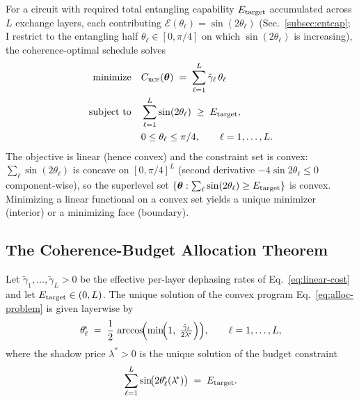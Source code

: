 For a circuit with required total entangling capability
$E_{\rm target}$ accumulated across $L$ exchange layers, each
contributing $\mathcal{E}(\theta_\ell) = \sin(2\theta_\ell)$
(Sec.~\ref{subsec:entcap}; I restrict to the entangling half
$\theta_\ell \in [0, \pi/4]$ on which $\sin(2\theta_\ell)$ is
increasing), the coherence-optimal schedule solves
%
\begin{equation}
\label{eq:alloc-problem}
\begin{aligned}
\text{minimize}\quad & C_{\textsc{rcf}}(\boldsymbol\theta) \;=\;
   \sum_{\ell=1}^L \tilde\gamma_\ell\, \theta_\ell \\
\text{subject to}\quad & \sum_{\ell=1}^L \sin(2\theta_\ell) \;\geq\; E_{\rm target}, \\
& 0 \leq \theta_\ell \leq \pi/4, \qquad \ell = 1,\dots, L.
\end{aligned}
\end{equation}
%
The objective is linear (hence convex) and the constraint set is
convex: $\sum_\ell \sin(2\theta_\ell)$ is concave on
$[0,\pi/4]^L$ (second derivative $-4\sin 2\theta_\ell \leq 0$
component-wise), so the superlevel set
$\{\boldsymbol\theta : \sum_\ell \sin(2\theta_\ell) \geq E_{\rm target}\}$
is convex.
Minimizing a linear functional on a convex set yields a unique
minimizer (interior) or a minimizing face (boundary).

\subsection{The Coherence-Budget Allocation Theorem}
\label{subsec:thm-alloc}

\begin{theorem}
\label{thm:alloc}
Let $\tilde\gamma_1,\dots,\tilde\gamma_L > 0$ be the effective
per-layer dephasing rates of Eq.~\eqref{eq:linear-cost} and let
$E_{\rm target} \in (0, L)$.
The unique solution of the convex program
Eq.~\eqref{eq:alloc-problem} is given layerwise by
%
\begin{equation}
\label{eq:alloc-solution}
\theta_\ell^{\!*} \;=\;
  \frac{1}{2}\,\arccos\!\Bigl(
    \min\!\Bigl(1,\;\tfrac{\tilde\gamma_\ell}{2\lambda^{\!*}}\Bigr)
  \Bigr),
  \qquad \ell = 1,\dots,L,
\end{equation}
%
where the shadow price $\lambda^{\!*} > 0$ is the unique
solution of the budget constraint
%
\begin{equation}
\label{eq:lambda-eq}
\sum_{\ell=1}^L \sin\!\bigl(2\theta_\ell^{\!*}(\lambda^{\!*})\bigr)
\;=\; E_{\rm target}.
\end{equation}
\end{theorem}

